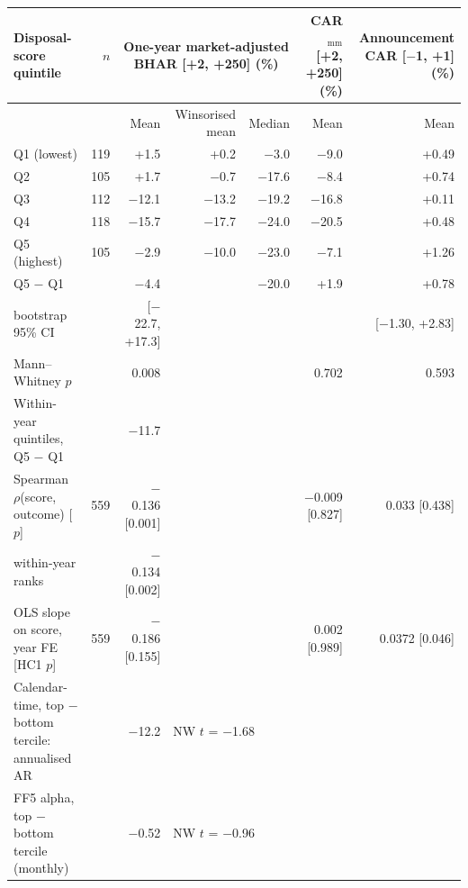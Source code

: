 \begin{tabular}{>{\raggedright\arraybackslash}p{5.6cm}rrrrrr}
\toprule
Disposal-score quintile & $n$ & \multicolumn{3}{c}{One-year market-adjusted BHAR [+2, +250] (\%)} & CAR$_{\text{mm}}$ [+2, +250] (\%) & Announcement CAR [$-$1, +1] (\%) \\
\cmidrule(lr){3-5}
 & & Mean & Winsorised mean & Median & Mean & Mean \\
\midrule
Q1 (lowest) & 119 & +1.5 & +0.2 & $-$3.0 & $-$9.0 & +0.49 \\
Q2 & 105 & +1.7 & $-$0.7 & $-$17.6 & $-$8.4 & +0.74 \\
Q3 & 112 & $-$12.1 & $-$13.2 & $-$19.2 & $-$16.8 & +0.11 \\
Q4 & 118 & $-$15.7 & $-$17.7 & $-$24.0 & $-$20.5 & +0.48 \\
Q5 (highest) & 105 & $-$2.9 & $-$10.0 & $-$23.0 & $-$7.1 & +1.26 \\
\midrule
Q5 $-$ Q1 & & $-$4.4 & & $-$20.0 & +1.9 & +0.78 \\
\quad bootstrap 95\% CI & & [$-$22.7, +17.3] & & & & [$-$1.30, +2.83] \\
\quad Mann--Whitney $p$ & & 0.008 & & & 0.702 & 0.593 \\
Within-year quintiles, Q5 $-$ Q1 & & $-$11.7 & & & & \\
Spearman $\rho$(score, outcome) [$p$] & 559 & $-$0.136 [0.001] & & & $-$0.009 [0.827] & 0.033 [0.438] \\
\quad within-year ranks & & $-$0.134 [0.002] & & & & \\
OLS slope on score, year FE [HC1 $p$] & 559 & $-$0.186 [0.155] & & & 0.002 [0.989] & 0.0372 [0.046] \\
\midrule
Calendar-time, top $-$ bottom tercile: annualised AR & & $-$12.2 & \multicolumn{2}{l}{NW $t$ = $-$1.68} & & \\
FF5 alpha, top $-$ bottom tercile (monthly) & & $-$0.52 & \multicolumn{2}{l}{NW $t$ = $-$0.96} & & \\
\bottomrule
\end{tabular}
